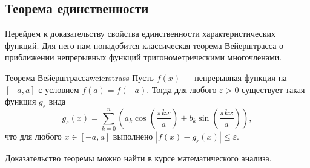 \subsection{Теорема единственности}

Перейдем к доказательству свойства единственности характеристических функций. Для него нам понадобится классическая теорема Вейерштрасса о приближении непрерывных функций тригонометрическими многочленами.

\begin{theorem}{Теорема Вейерштрасса}{weierstrass}
    Пусть $f(x)$ --- непрерывная функция на $[-a, a]$ с условием $f(a) = f(-a)$. Тогда для любого $\varepsilon > 0$ существует такая функция $g_{\varepsilon}$ вида
    \begin{equation*}
        g_{\varepsilon}(x) = \sum_{k=0}^n \left( a_k \cos \left(\frac{\pi k x}{a}\right) + b_k \sin \left(\frac{\pi k x}{a}\right) \right),
    \end{equation*}
    что для любого $x \in [-a, a]$ выполнено $|f(x) - g_{\varepsilon}(x)| \leqslant \varepsilon$.
\end{theorem}

Доказательство теоремы можно найти в курсе математического анализа.

\vspace{1em}

